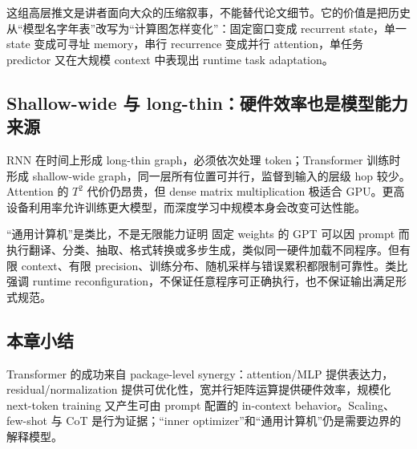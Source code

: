
这组高层推文是讲者面向大众的压缩叙事，不能替代论文细节。它的价值是把历史从“模型名字年表”改写为“计算图怎样变化”：固定窗口变成 recurrent state，单一 state 变成可寻址 memory，串行 recurrence 变成并行 attention，单任务 predictor 又在大规模 context 中表现出 runtime task adaptation。

\subsection{Shallow-wide 与 long-thin：硬件效率也是模型能力来源}

RNN 在时间上形成 long-thin graph，必须依次处理 token；Transformer 训练时形成 shallow-wide graph，同一层所有位置可并行，监督到输入的层级 hop 较少。Attention 的 $T^2$ 代价仍昂贵，但 dense matrix multiplication 极适合 GPU。更高设备利用率允许训练更大模型，而深度学习中规模本身会改变可达性能。


\begin{importantbox}{“通用计算机”是类比，不是无限能力证明}
固定 weights 的 GPT 可以因 prompt 而执行翻译、分类、抽取、格式转换或多步生成，类似同一硬件加载不同程序。但有限 context、有限 precision、训练分布、随机采样与错误累积都限制可靠性。类比强调 runtime reconfiguration，不保证任意程序可正确执行，也不保证输出满足形式规范。
\end{importantbox}


\subsection{本章小结}

Transformer 的成功来自 package-level synergy：attention/MLP 提供表达力，residual/normalization 提供可优化性，宽并行矩阵运算提供硬件效率，规模化 next-token training 又产生可由 prompt 配置的 in-context behavior。Scaling、few-shot 与 CoT 是行为证据；“inner optimizer”和“通用计算机”仍是需要边界的解释模型。

